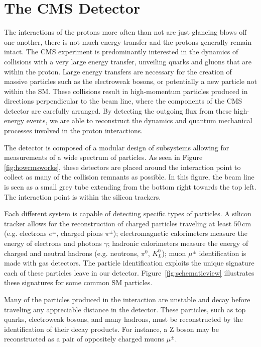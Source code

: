 \chapter{The CMS Detector}
\label{chap:detector}

The interactions of the protons more often than not are just glancing blows off one another, there is not much energy transfer and the protons generally remain intact. The CMS experiment is predominantly interested in the dynamics of collisions with a very large energy transfer, unveiling quarks and gluons that are within the proton. Large energy transfers are necessary for the creation of massive particles such as the electroweak bosons, or potentially a new particle not within the SM. These collisions result in high-momentum particles produced in directions perpendicular to the beam line, where the components of the CMS detector are carefully arranged. By detecting the outgoing flux from these high-energy events, we are able to reconstruct the dynamics and quantum mechanical processes involved in the proton interactions.

The detector is composed of a modular design of subsystems allowing for measurements of a wide spectrum of particles. As seen in Figure \ref{fig:howcmsworks}, these detectors are placed around the interaction point to collect as many of the collision remnants as possible. In this figure, the beam line is seen as a small grey tube extending from the bottom right towards the top left. The interaction point is within the silicon trackers.

Each different system is capable of detecting specific types of particles. A silicon tracker allows for the reconstruction of charged particles traveling at least $50\,\mathrm{cm}$ (e.g. electrons $e^{\pm}$, charged pions $\pi^{\pm}$); electromagnetic calorimeters measure the energy of electrons and photons $\gamma$; hadronic calorimeters measure the energy of charged and neutral hadrons (e.g. neutrons, $\pi^{0}$, $K^{0}_{L}$); muon $\mu^{\pm}$ identification is made with gas detectors. The particle identification exploits the unique signature each of these particles leave in our detector. Figure~\ref{fig:schematicview} illustrates these signatures for some common SM particles. 

Many of the particles produced in the interaction are unstable and decay before traveling any appreciable distance in the detector. These particles, such as top quarks, electroweak bosons, and many hadrons, must be reconstructed by the identification of their decay products. For instance, a Z boson may be reconstructed as a pair of oppositely charged muons $\mu^{\pm}$.


